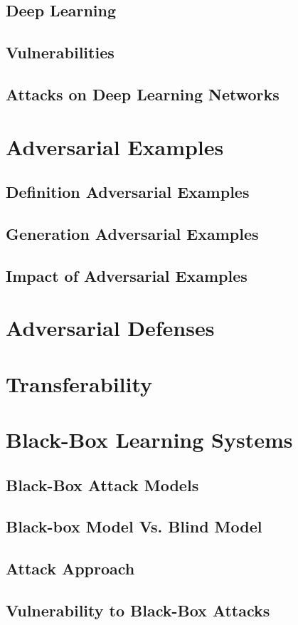 \documentclass[grad,lot,lof,11pt,oneside,onehalfspace]{RUthesis}
\begin{document}
\subsection{Deep Learning}
\subsection{Vulnerabilities}
\subsection{Attacks on Deep Learning Networks}
\section{Adversarial Examples}
\subsection{Definition Adversarial Examples}
\subsection{Generation Adversarial Examples}
\subsection{Impact of Adversarial Examples}
\section{Adversarial Defenses}
\section{Transferability}
\newpage
\section{Black-Box Learning Systems}
\subsection{Black-Box Attack Models}
\subsection{Black-box Model Vs. Blind Model}
\subsection{Attack Approach}
\subsection{Vulnerability to Black-Box Attacks}
\end{document}
